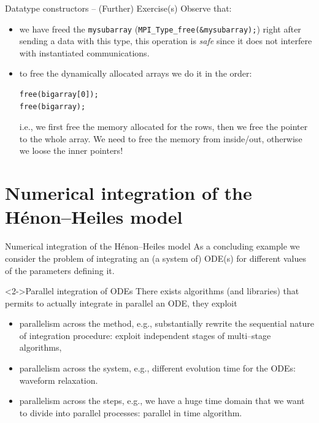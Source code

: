 \documentclass[xcolor={svgnames,usenames}]{beamer}
\begin{document}
\begin{frame}[fragile]{Datatype constructors -- (Further) Exercise(s)}
Observe that:
\begin{itemize}
	\item we have freed the \texttt{mysubarray} (\texttt{MPI_Type_free(&mysubarray);}) right after sending a data with this type, this operation is \emph{safe} since it does not interfere with instantiated communications.
	\item to free the dynamically allocated arrays we do it in the order:
\begin{verbatim}
free(bigarray[0]);
free(bigarray);
\end{verbatim}
	i.e., we first free the memory allocated for the rows, then we free the pointer to the whole array. We need to free the memory from inside/out, otherwise we loose the inner pointers!
\end{itemize}

\end{frame}

\section{Numerical integration of the H\'enon--Heiles model}

\begin{frame}{Numerical integration of the H\'enon--Heiles model}
As a concluding example we consider the problem of integrating an (a system of) ODE(s) for different values of the parameters defining it.
\begin{block}<2->{Parallel integration of ODEs}
There exists algorithms (and libraries) that permits to actually integrate in parallel an ODE, they exploit
\begin{itemize}
	\item parallelism across the method, e.g., substantially rewrite the sequential nature of integration procedure: exploit independent stages of multi--stage algorithms, 
	\item parallelism across the system, e.g., different evolution time for the ODEs: waveform relaxation.
	\item parallelism across the steps, e.g., we have a huge time domain that we want to divide into parallel processes: parallel in time algorithm.
\end{itemize}
\end{block}

\end{frame}
\end{document}
